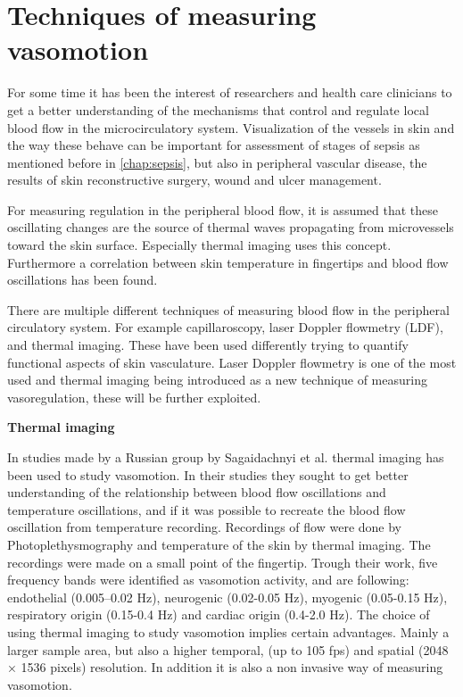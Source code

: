 \section{Techniques of measuring vasomotion} \label{freq}

For some time it has been the interest of researchers and health care clinicians to get a better understanding of the mechanisms that control and regulate local blood flow in the microcirculatory system\cite{sagaidachnyi2014,sagaidachnyi2017,geyer2004,liu2012}. 
Visualization of the vessels in skin and the way these behave can be important for assessment of stages of sepsis as mentioned before in \cref{chap:sepsis}, but also in peripheral vascular disease, the results of skin reconstructive surgery, wound and ulcer management.\cite{liu2012,kanta2014}

For measuring regulation in the peripheral blood flow, it is assumed that these oscillating changes are the source of thermal waves propagating from microvessels toward the skin surface. Especially thermal imaging uses this concept.\cite{sagaidachnyi2017}
Furthermore a correlation between skin temperature in fingertips and blood flow oscillations has been found\cite{sagaidachnyi2014}.

There are multiple different techniques of measuring blood flow in the peripheral circulatory system. For example capillaroscopy, laser Doppler flowmetry (LDF), and thermal imaging. These have been used differently trying to quantify functional aspects of skin vasculature.\cite{liu2012} Laser Doppler flowmetry is one of the most used\cite{geyer2004} and thermal imaging being introduced as a new technique of measuring vasoregulation, these will be further exploited\cite{sagaidachnyi2014}.     

\textbf{Thermal imaging}

In studies made by a Russian group by Sagaidachnyi et al. thermal imaging has been used to study vasomotion. In their studies they sought to get better understanding of the relationship between blood flow oscillations and temperature oscillations, and if it was possible to recreate the blood flow oscillation from temperature recording. Recordings of flow were done by Photoplethysmography and temperature of the skin by thermal imaging. The recordings were made on a small point of the fingertip. Trough their work, five frequency bands were identified as vasomotion activity, and are following: endothelial (0.005–0.02 Hz), neurogenic (0.02-0.05 Hz), myogenic (0.05-0.15 Hz), respiratory origin (0.15-0.4 Hz) and cardiac origin (0.4-2.0 Hz).\cite{sagaidachnyi2017,sagaidachnyi2014}
The choice of using thermal imaging to study vasomotion implies certain advantages. Mainly a larger sample area, but also a higher temporal, (up to 105 fps) and spatial (2048 × 1536 pixels) resolution. In addition it is also a non invasive way of measuring vasomotion.\cite{sagaidachnyi2017}





